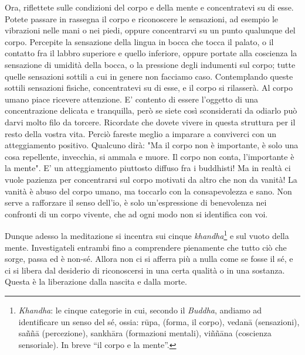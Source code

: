 Ora, riflettete sulle condizioni del corpo e della mente e concentratevi
su di esse. Potete passare in rassegna il corpo e riconoscere le
sensazioni, ad esempio le vibrazioni nelle mani o nei piedi, oppure
concentrarvi su un punto qualunque del corpo. Percepite la sensazione
della lingua in bocca che tocca il palato, o il contatto fra il labbro
superiore e quello inferiore, oppure portate alla coscienza la
sensazione di umidità della bocca, o la pressione degli indumenti sul
corpo; tutte quelle sensazioni sottili a cui in genere non facciamo
caso. Contemplando queste sottili sensazioni fisiche, concentratevi su
di esse, e il corpo si rilasserà. Al corpo umano piace ricevere
attenzione. E' contento di essere l'oggetto di una concentrazione
delicata e tranquilla, però se siete così sconsiderati da odiarlo può
darvi molto filo da torcere. Ricordate che dovete vivere in questa
struttura per il resto della vostra vita. Perciò fareste meglio a
imparare a conviverci con un atteggiamento positivo. Qualcuno dirà: "Ma
il corpo non è importante, è solo una cosa repellente, invecchia, si
ammala e muore. Il corpo non conta, l'importante è la mente". E' un
atteggiamento piuttosto diffuso fra i buddhisti! Ma in realtà ci vuole
pazienza per concentrarsi sul corpo motivati da altro che non da vanità!
La vanità è abuso del corpo umano, ma toccarlo con la consapevolezza e
sano. Non serve a rafforzare il senso dell'io, è solo un'espressione di
benevolenza nei confronti di un corpo vivente, che ad ogni modo non si
identifica con voi.

Dunque adesso la meditazione si incentra sui cinque \textit{khandha}\footnote{\textit{Khandha}: le cinque categorie in cui, secondo il \textit{Buddha},
andiamo ad identificare un senso del sé, ossia: rūpa, (forma, il corpo),
vedanā (sensazioni), saññā (percezione), sankhāra (formazioni mentali),
viññāna (coscienza sensoriale). In breve “il corpo e la mente”.} e
sul vuoto della mente. Investigateli entrambi fino a comprendere
pienamente che tutto ciò che sorge, passa ed è non-sé. Allora non ci si
afferra più a nulla come se fosse il sé, e ci si libera dal desiderio di
riconoscersi in una certa qualità o in una sostanza. Questa è la
liberazione dalla nascita e dalla morte.

